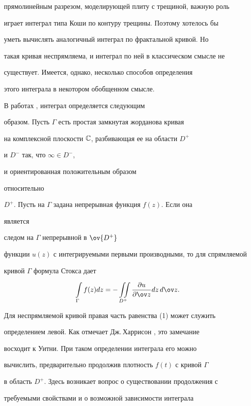 прямолинейным разрезом, моделирующей плиту с трещиной, важную роль 


играет интеграл типа Коши по контуру трещины. Поэтому хотелось бы 


уметь вычислять аналогичный интеграл по фрактальной кривой. Но 


такая кривая неспрямляема, и интеграл по ней в классическом смысле не 


существует. Имеется, однако, несколько способов определения 


этого интеграла в некотором обобщенном смысле. 


 


В работах \cite{3}, \cite{4} интеграл определяется следующим 


образом. Пусть $\Gamma$ есть простая замкнутая жорданова кривая 


на комплексной плоскости $\Bbb C$, разбивающая ее на области $D^+$ 


и $D^-$ так, что $\infty\in D^-$, 


и ориентированная положительным образом 


относительно 


$D^+$. Пусть на $\Gamma$ задана непрерывная функция $f(z)$. Если она 


является 


следом на $\Gamma$ непрерывной в $\ov{D^+}$ 


функции $u(z)$ с интегрируемыми первыми производными, то для спрямляемой 


кривой $\Gamma$ формула Стокса дает 


\begin{equation} 


\intl_\Gamma f(z)dz=-\iint\limits_{D^+}\myfrac{u}{\ov z}dz\,d\ov z. 


\end{equation} 


Для неспрямляемой кривой правая часть равенства (1) может служить 


определением левой. Как отмечает Дж.\,Харрисон \cite{5}, это замечание 


восходит к Уитни. При таком определении интеграла его можно 


вычислить, предварительно продолжив плотность $f(t)$ с кривой $\Gamma$ 


в область $D^+$. Здесь возникает вопрос о существовании продолжения с 


требуемыми свойствами и о возможной зависимости интеграла 


